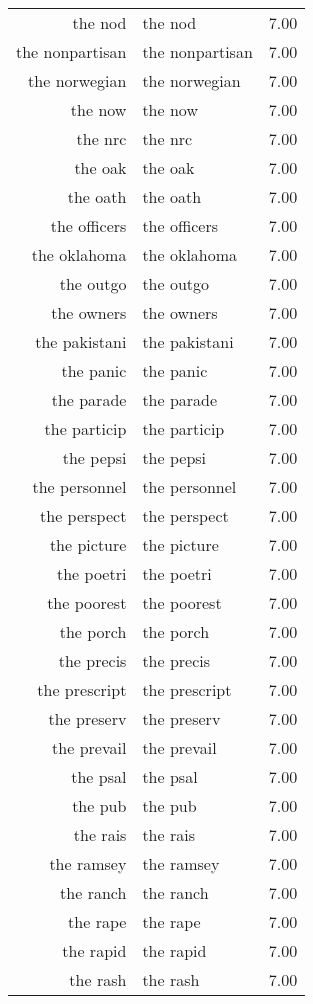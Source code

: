 \begin{table}[ht]
\begin{tabular}{rlr}
  the nod & the nod & 7.00 \\ 
  the nonpartisan & the nonpartisan & 7.00 \\ 
  the norwegian & the norwegian & 7.00 \\ 
  the now & the now & 7.00 \\ 
  the nrc & the nrc & 7.00 \\ 
  the oak & the oak & 7.00 \\ 
  the oath & the oath & 7.00 \\ 
  the officers & the officers & 7.00 \\ 
  the oklahoma & the oklahoma & 7.00 \\ 
  the outgo & the outgo & 7.00 \\ 
  the owners & the owners & 7.00 \\ 
  the pakistani & the pakistani & 7.00 \\ 
  the panic & the panic & 7.00 \\ 
  the parade & the parade & 7.00 \\ 
  the particip & the particip & 7.00 \\ 
  the pepsi & the pepsi & 7.00 \\ 
  the personnel & the personnel & 7.00 \\ 
  the perspect & the perspect & 7.00 \\ 
  the picture & the picture & 7.00 \\ 
  the poetri & the poetri & 7.00 \\ 
  the poorest & the poorest & 7.00 \\ 
  the porch & the porch & 7.00 \\ 
  the precis & the precis & 7.00 \\ 
  the prescript & the prescript & 7.00 \\ 
  the preserv & the preserv & 7.00 \\ 
  the prevail & the prevail & 7.00 \\ 
  the psal & the psal & 7.00 \\ 
  the pub & the pub & 7.00 \\ 
  the rais & the rais & 7.00 \\ 
  the ramsey & the ramsey & 7.00 \\ 
  the ranch & the ranch & 7.00 \\ 
  the rape & the rape & 7.00 \\ 
  the rapid & the rapid & 7.00 \\ 
  the rash & the rash & 7.00 \\ 

\end{tabular}
\end{table}
